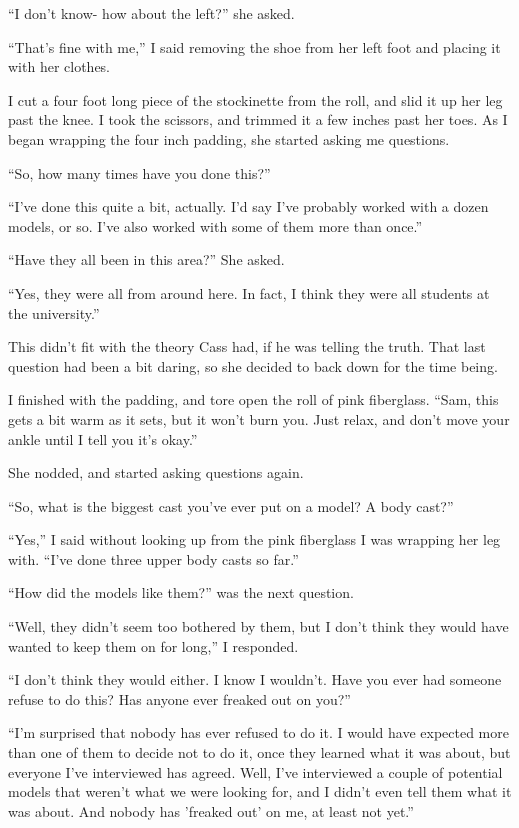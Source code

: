 ``I don't know- how about the left?'' she asked.

``That's fine with me,'' I said removing the shoe from her left foot and placing it with
her clothes.

I cut a four foot long piece of the stockinette from the roll, and slid it up her leg past
the knee. I took the scissors, and trimmed it a few inches past her toes. As I began wrapping
the four inch padding, she started asking me questions.

``So, how many times have you done this?''

``I've done this quite a bit, actually. I'd say I've probably worked with a dozen models,
or so. I've also worked with some of them more than once.''

``Have they all been in this area?'' She asked.

``Yes, they were all from around here. In fact, I think they were all students at the
university.''

This didn't fit with the theory Cass had, if he was telling the truth. That last question
had been a bit daring, so she decided to back down for the time being.

I finished with the padding, and tore open the roll of pink fiberglass. ``Sam, this gets a
bit warm as it sets, but it won't burn you. Just relax, and don't move your ankle until I tell
you it's okay.''

She nodded, and started asking questions again.

``So, what is the biggest cast you've ever put on a model? A body cast?''

``Yes,'' I said without looking up from the pink fiberglass I was wrapping her leg with.
``I've done three upper body casts so far.''

``How did the models like them?'' was the next question.

``Well, they didn't seem too bothered by them, but I don't think they would have wanted to
keep them on for long,'' I responded.

``I don't think they would either. I know I wouldn't. Have you ever had someone refuse to
do this? Has anyone ever freaked out on you?''

``I'm surprised that nobody has ever refused to do it. I would have expected more than one
of them to decide not to do it, once they learned what it was about, but everyone I've
interviewed has agreed. Well, I've interviewed a couple of potential models that weren't what we
were looking for, and I didn't even tell them what it was about. And nobody has 'freaked out' on
me, at least not yet.''

